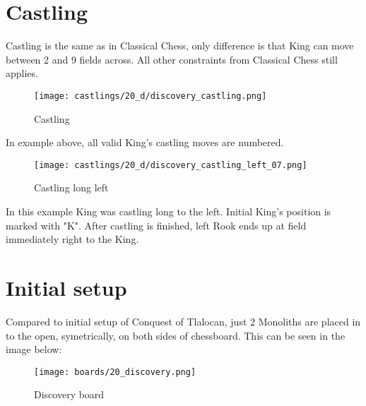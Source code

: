 \clearpage %

\section*{Castling}

Castling is the same as in Classical Chess, only difference is that King can move between 2 and 9 fields across.
All other constraints from Classical Chess still applies.

\noindent
\begin{figure}[!h]
\texttt{[image: castlings/20\_d/discovery\_castling.png]}
\caption{Castling}
\label{fig:discovery_castling}
\end{figure}

In example above, all valid King's castling moves are numbered.

\noindent
\begin{figure}[!h]
\texttt{[image: castlings/20\_d/discovery\_castling\_left\_07.png]}
\caption{Castling long left}
\label{fig:discovery_castling_left_07}
\end{figure}

In this example King was castling long to the left. Initial King's position is marked with "K".
After castling is finished, left Rook ends up at field immediately right to the King.

\clearpage %

\section*{Initial setup}

Compared to initial setup of Conquest of Tlalocan, just 2 Monoliths are placed in to the open,
symetrically, on both sides of chessboard. This can be seen in the image below:

\noindent
\begin{figure}[h]
\texttt{[image: boards/20\_discovery.png]}
\caption{Discovery board}
\label{fig:20_discovery}
\end{figure}

\clearpage %
